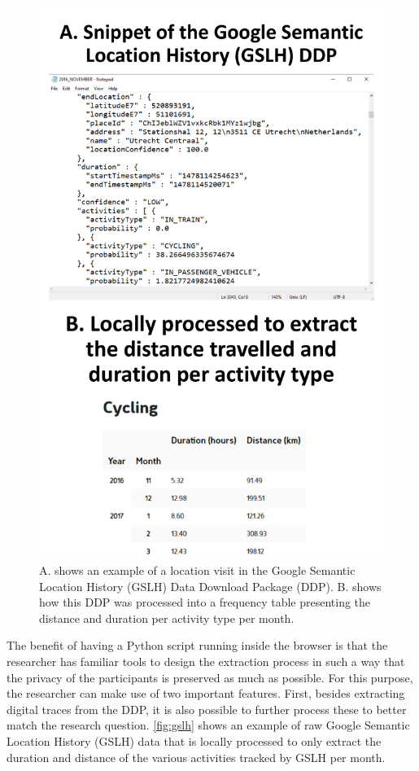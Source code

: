 \documentclass[
]{article}
\begin{document}
\begin{figure}
\centering
\includegraphics{GSLH_image.pdf}
\caption{A. shows an example of a location visit in the Google Semantic
Location History (GSLH) Data Download Package (DDP). B. shows how this
DDP was processed into a frequency table presenting the distance and
duration per activity type per month. \label{fig:gslh}}
\end{figure}

The benefit of having a Python script running inside the browser is that
the researcher has familiar tools to design the extraction process in
such a way that the privacy of the participants is preserved as much as
possible. For this purpose, the researcher can make use of two important
features. First, besides extracting digital traces from the DDP, it is
also possible to further process these to better match the research
question. \autoref{fig:gslh} shows an example of raw Google Semantic
Location History (GSLH) data that is locally processed to only extract
the duration and distance of the various activities tracked by GSLH per
month.
\end{document}
